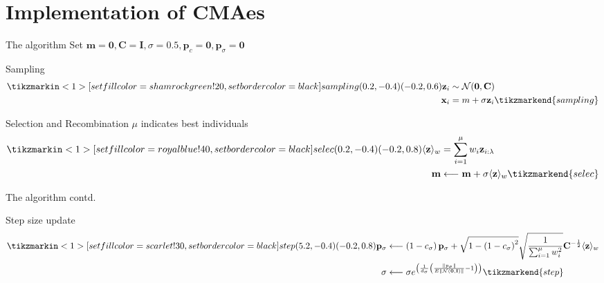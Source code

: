 \documentclass[presentation]{beamer}
\begin{document}
\section{Implementation of CMAes}
\label{sec:orge083df8}
\begin{frame}[label={sec:orgb47e5c3}]{The algorithm}
Set \(\mathbf{m} = \mathbf{0}, \mathbf{C} = \mathbf{I}, \sigma =
 0.5, \mathbf{p}_c = \mathbf{0}, \mathbf{p}_{\sigma} = \mathbf{0}\)
\begin{block}{Sampling}
\[ \begin{aligned}
	  \tikzmarkin<1>[set fill color=shamrockgreen!20, set border color=black]{sampling}(0.2,-0.4)(-0.2,0.6)
	  \mathbf{z}_{i} & \sim \mathcal{N}(\mathbf{0}, \mathbf{C}) \\
	  \mathbf{x}_{i} &= m+\sigma \mathbf{z}_{i} \tikzmarkend{sampling}
	  \end{aligned} \]
\end{block}

\begin{block}{Selection and Recombination}
\(\mu\) indicates best individuals
  \[ \begin{aligned}
	  \tikzmarkin<1>[set fill color=royalblue!40, set border color=black]{selec}(0.2,-0.4)(-0.2,0.8)
	  \langle\mathbf{z}\rangle_{w} &= \sum_{i=1}^{\mu} w_{i} \mathbf{z}_{i : \lambda} \\
	  \mathbf{m} &\longleftarrow \mathbf{m}+\sigma\langle\mathbf{z}\rangle_{w} \tikzmarkend{selec}
	  \end{aligned} \]
\end{block}
\end{frame}

\begin{frame}[label={sec:orgb3f48f8}]{The algorithm contd.}
\begin{block}{Step size update}
\[ \begin{aligned}
	 \tikzmarkin<1>[set fill color=scarlet!30, set border color=black]{step}(5.2,-0.4)(-0.2,0.8)
	 \mathbf{p}_{\sigma} &\longleftarrow\left(1-c_{\sigma}\right)
	 \mathbf{p}_{\sigma}+\sqrt{1-\left(1-c_{\sigma}\right)^{2}}
	 \sqrt{\frac{1}{\sum_{i=1}^{\mu} w_{i}^{2}}}
	 \mathbf{C}^{-\frac{1}{2}}\langle\mathbf{z}\rangle_{w} \\
	 \sigma &\longleftarrow \sigma
	 e^{\left(\frac{1}{d_{\sigma}}\left(\frac{\left\|p_{\sigma}\right\|}{E\|\mathcal{N}(\mathbf{0},
	 \mathbf{I})\|}-1\right)\right)} \tikzmarkend{step}
	 \end{aligned} \]
\end{block}
\end{frame}
\end{document}
